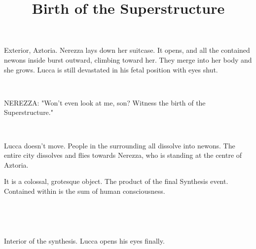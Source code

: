 \documentclass[11pt]{article}
\begin{document}
\ttfamily
\title{Birth of the Superstructure}
\maketitle


Exterior, Aztoria. 
Nerezza lays down her suitcase. 
It opens, and all the contained newons inside burst outward, climbing toward her.
They merge into her body and she grows.
Lucca is still devastated in his fetal position with eyes shut.

\ 

NEREZZA: "Won't even look at me, son?
Witness the birth of the Superstructure."

\ 

Lucca doesn't move. 
People in the surrounding all dissolve into newons.
The entire city dissolves and flies towards Nerezza, who is standing at the centre of Aztoria. 

It is a colossal, grotesque object.
The product of the final Synthesis event.
Contained within is the sum of human consciousness.

\ 

\ 

Interior of the synthesis. 
Lucca opens his eyes finally. 
\end{document}
